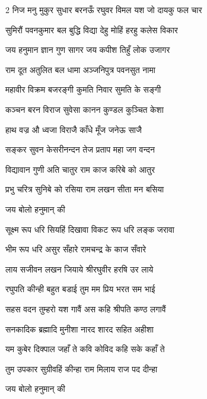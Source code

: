 
\setlength{\columnsep}{10pt}\newpage
{}
\begin{large}
\begin{multicols}{2}
{निज मनु मुकुर सुधार}
{बरनऊँ रघुवर विमल यश}
{जो दायकु फल चार}

{सुमिरौं पवनकुमार}
{बल बुद्धि विद्या देहु मोहिं}
{हरहु कलेस विकार}

\resetShloka
\twolineshloka
{जय हनुमान ज्ञान गुण सागर}
{जय कपीश तिहुँ लोक उजागर}

\twolineshloka
{राम दूत अतुलित बल धामा}
{अञ्जनिपुत्र पवनसुत नामा}

\twolineshloka
{महावीर विक्रम बजरङ्गी}
{कुमति निवार सुमति के सङ्गी}

\twolineshloka
{कञ्चन बरन विराज सुवेसा}
{कानन कुण्डल कुञ्चित केशा}

\twolineshloka
{हाथ वज्र औ ध्वजा विराजै}
{काँधे मूँज जनेऊ साजै}

\twolineshloka
{सङ्कर सुवन केसरीनन्दन}
{तेज प्रताप महा जग वन्दन}

\twolineshloka
{विद्यावान गुणी अति चातुर}
{राम काज करिबे को आतुर}

\twolineshloka
{प्रभु चरित्र सुनिबे को रसिया}
{राम लखन सीता मन बसिया}

{जय बोलो हनुमान् की}

\twolineshloka
{सूक्ष्म रूप धरि सियहिं दिखावा}
{विकट रूप धरि लङ्क जरावा}

\twolineshloka
{भीम रूप धरि असुर सँहारे}
{रामचन्द्र के काज सँवारे}

\twolineshloka
{लाय सजीवन लखन जियाये}
{श्रीरघुवीर हरषि उर लाये}

\twolineshloka
{रघुपति कीन्ही बहुत बडाई}
{तुम मम प्रिय भरत सम भाई}

\twolineshloka
{सहस वदन तुम्हरो यश गावैं}
{अस कहि श्रीपति कण्ठ लगावैं}

\twolineshloka
{सनकादिक ब्रह्मादि मुनीशा}
{नारद शारद सहित अहीशा}

\twolineshloka
{यम कुबेर दिक्पाल जहाँ ते}
{कवि कोविद कहि सके कहाँ ते}

\twolineshloka
{तुम उपकार सुग्रीवहिं कीन्हा}
{राम मिलाय राज पद दीन्हा}

{जय बोलो हनुमान् की}


\end{multicols}
\end{large}
